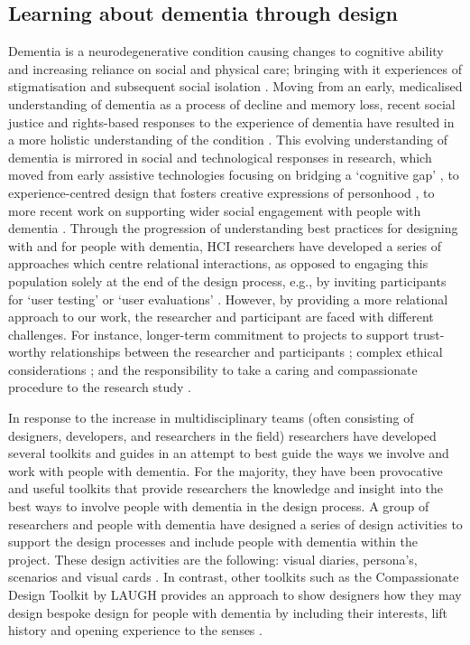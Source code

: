 \subsection{Learning about dementia through design}
\label{DemVR:DementiaThroughDesign}
Dementia is a neurodegenerative condition causing changes to cognitive ability and increasing reliance on social and physical care; bringing with it experiences of stigmatisation and subsequent social isolation  \citep{herrmann_systematic_2018}. Moving from an early, medicalised understanding of dementia as a process of decline and memory loss, recent social justice and rights-based responses to the experience of dementia have resulted in a more holistic understanding of the condition \citep{shakespeare_rights_2019}. This evolving understanding of dementia is mirrored in social and technological responses in research, which moved from early assistive technologies focusing on bridging a ‘cognitive gap’ \citep{mulvenna_supporting_2010}, to experience-centred design that fosters creative expressions of personhood \citep{morrissey_value_2017}, to more recent work on supporting wider social engagement with people with dementia \citep{foley_care_2019, lazar_safe_2019, welsh_ticket_2018}. Through the progression of understanding best practices for designing with and for people with dementia, HCI researchers have developed a series of approaches which centre relational interactions, as opposed to  engaging this population solely at the end of the design process,  e.g., by inviting participants for ‘user testing’ or ‘user evaluations’ \citep{brankaert_intersections_2019,schorch_designing_2016, vines_designing_2013}. However, by providing a more relational approach to our work, the researcher and participant are faced with different challenges. For instance, longer-term commitment to projects to support trust-worthy relationships between the researcher and participants \citep{hendriks_challenges_2014}; complex ethical considerations \citep{hornung_challenges_2016}; and the responsibility to take a caring and compassionate procedure to the research study \citep{balaam_emotion_2019}. 

In response to the increase in multidisciplinary teams (often consisting of designers, developers, and researchers in the field) researchers have developed several toolkits and guides \citep{astell_using_2019, broderick2020theory,jais_evidence_2018} in an attempt to best guide the ways we involve and work with people with dementia.  For the majority, they have been provocative and useful toolkits that provide researchers the knowledge and insight into the best ways to involve people with dementia in the design process. A group of researchers and people with dementia have designed a series of design activities to support the design processes and include people with dementia within the project. These design activities are the following: visual diaries, persona’s, scenarios and visual cards \citep{wang2021know}. In contrast, other toolkits such as the Compassionate Design Toolkit by LAUGH provides an approach to show designers how they may design bespoke design for people with dementia by including their interests, lift history and opening experience to the senses \citep{treadaway2016laugh}. 

